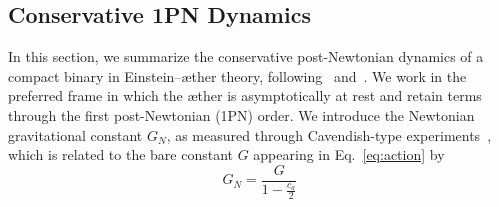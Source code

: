 \documentclass[
    floats,
    floatfix,
    amssymb,
    prd,
    twocolumn,
    superscriptaddress,
    nofootinbib,
    unicode,
    colorlinks=true,
    linktocpage=true
]{revtex4-2}
\begin{document}
\subsection{Conservative 1PN Dynamics}

In this section, we summarize the conservative post-Newtonian  dynamics of a compact binary in Einstein--\ae ther  theory, following~\cite{Gupta_2021} and~\cite{Will_2018}. We work in the preferred frame in which the \ae ther is asymptotically at rest and retain terms through the first post-Newtonian (1PN) order. We introduce the Newtonian gravitational constant $G_N$, as measured through Cavendish-type
experiments~\cite{Carroll:2004ai, Yagi_2014}, which is related to the bare constant
 $G$ appearing in Eq.~\eqref{eq:action} by
\begin{equation}
G_N=\frac{G}{1-\frac{c_a}{2}}
\label{eq:Cavendish}
\end{equation}
\end{document}
